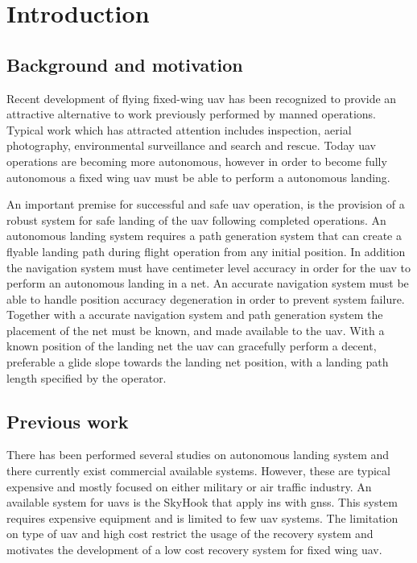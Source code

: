 \chapter{Introduction}
\section{Background and motivation}
Recent development of flying fixed-wing \acrfull{uav} has been recognized to provide an attractive alternative to work previously performed by manned operations. Typical work which has attracted attention includes inspection, aerial photography, environmental surveillance and search and rescue. Today \gls{uav} operations are becoming more autonomous, however in order to become fully autonomous a fixed wing \gls{uav} must be able to perform a autonomous landing.

An important premise for successful and safe \gls{uav} operation, is the provision of a robust system for safe landing of the \gls{uav} following completed operations. An autonomous landing system requires a path generation system that can create a flyable landing path during flight operation from any initial position. In addition the navigation system must have centimeter level accuracy in order for the \gls{uav} to perform an autonomous landing in a net. An accurate navigation system must be able to handle position accuracy degeneration in order to prevent system failure. Together with a accurate navigation system and path generation system the placement of the net must be known, and made available to the \gls{uav}. With a known position of the landing net the \gls{uav} can gracefully perform a decent, preferable a glide slope towards the landing net position, with a landing path length specified by the operator.
\section{Previous work}
There has been performed several studies on autonomous landing system and there currently exist commercial available systems. However, these are typical expensive and mostly focused on either military or air traffic industry. An available system for \glspl{uav} is the SkyHook that apply \gls{ins} with \acrfull{gnss}\citep{SkyHook}. This system requires expensive equipment and is limited to few \gls{uav} systems. The limitation on type of \gls{uav} and high cost restrict the usage of the recovery system and motivates the development of a low cost recovery system for fixed wing \gls{uav}.

